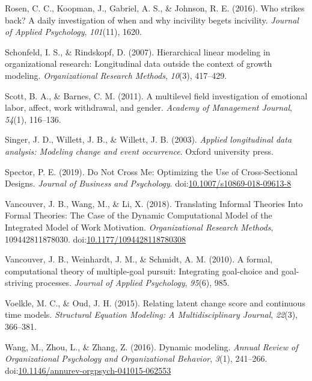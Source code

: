 \documentclass[english,,man]{apa6}
\begin{document}
\leavevmode\hypertarget{ref-rosen_who_2016}{}%
Rosen, C. C., Koopman, J., Gabriel, A. S., \& Johnson, R. E. (2016). Who strikes back? A daily investigation of when and why incivility begets incivility. \emph{Journal of Applied Psychology}, \emph{101}(11), 1620.

\leavevmode\hypertarget{ref-schonfeld2007hierarchical}{}%
Schonfeld, I. S., \& Rindskopf, D. (2007). Hierarchical linear modeling in organizational research: Longitudinal data outside the context of growth modeling. \emph{Organizational Research Methods}, \emph{10}(3), 417--429.

\leavevmode\hypertarget{ref-scott_multilevel_2011}{}%
Scott, B. A., \& Barnes, C. M. (2011). A multilevel field investigation of emotional labor, affect, work withdrawal, and gender. \emph{Academy of Management Journal}, \emph{54}(1), 116--136.

\leavevmode\hypertarget{ref-singer_applied_2003}{}%
Singer, J. D., Willett, J. B., \& Willett, J. B. (2003). \emph{Applied longitudinal data analysis: Modeling change and event occurrence}. Oxford university press.

\leavevmode\hypertarget{ref-spector_not_2019}{}%
Spector, P. E. (2019). Do Not Cross Me: Optimizing the Use of Cross-Sectional Designs. \emph{Journal of Business and Psychology}. doi:\href{https://doi.org/10.1007/s10869-018-09613-8}{10.1007/s10869-018-09613-8}

\leavevmode\hypertarget{ref-vancouver_translating_2018}{}%
Vancouver, J. B., Wang, M., \& Li, X. (2018). Translating Informal Theories Into Formal Theories: The Case of the Dynamic Computational Model of the Integrated Model of Work Motivation. \emph{Organizational Research Methods}, 109442811878030. doi:\href{https://doi.org/10.1177/1094428118780308}{10.1177/1094428118780308}

\leavevmode\hypertarget{ref-vancouver2010formal}{}%
Vancouver, J. B., Weinhardt, J. M., \& Schmidt, A. M. (2010). A formal, computational theory of multiple-goal pursuit: Integrating goal-choice and goal-striving processes. \emph{Journal of Applied Psychology}, \emph{95}(6), 985.

\leavevmode\hypertarget{ref-voelkle2015relating}{}%
Voelkle, M. C., \& Oud, J. H. (2015). Relating latent change score and continuous time models. \emph{Structural Equation Modeling: A Multidisciplinary Journal}, \emph{22}(3), 366--381.

\leavevmode\hypertarget{ref-Wang2016}{}%
Wang, M., Zhou, L., \& Zhang, Z. (2016). Dynamic modeling. \emph{Annual Review of Organizational Psychology and Organizational Behavior}, \emph{3}(1), 241--266. doi:\href{https://doi.org/10.1146/annurev-orgpsych-041015-062553}{10.1146/annurev-orgpsych-041015-062553}
\end{document}
